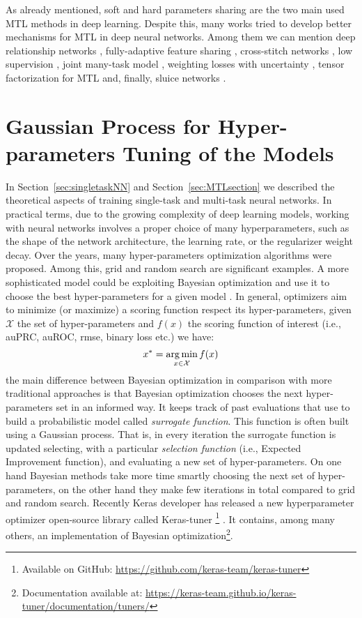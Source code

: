 As already mentioned, soft and hard parameters sharing are the two main used MTL methods in deep learning. Despite this, many works tried to develop better mechanisms for MTL in deep neural networks. Among them we can mention deep relationship networks \cite{NIPS2017_6757}, fully-adaptive feature sharing \cite{fullyadaptive}, cross-stitch networks \cite{crossstichnet}, low supervision \cite{sogaard-goldberg-2016-deep}, joint many-task model \cite{hashimoto-etal-2017-joint}, weighting losses with uncertainty \cite{Kendall}, tensor factorization for MTL \cite{Yang2017DeepMR} and, finally, sluice networks \cite{Ruder2017SluiceNL}.

\section{Gaussian Process for Hyper-parameters Tuning of the Models}
\label{sec:gaussianprocess}
In Section~\ref{sec:singletaskNN} and Section~\ref{sec:MTLsection} we
described the theoretical aspects of training single-task and multi-task neural networks. In practical terms, due to the
growing complexity of deep learning models, working with neural networks
involves a proper choice of many hyperparameters, such as the shape of
the network architecture, the learning rate, or the regularizer weight
decay. Over the years, many hyper-parameters optimization algorithms were
proposed. Among this, grid and random search \cite{BergstraB12} are significant examples. A more sophisticated model could be exploiting Bayesian optimization
and use it to choose the best hyper-parameters for a given model
\cite{SnoekGP}. In general, optimizers aim to minimize (or
maximize) a scoring function respect its hyper-parameters, given
$\mathcal{X}$ the set of hyper-parameters and $f(x)$ the scoring function of interest
(i.e., auPRC, auROC, rmse, binary loss etc.) we have: 
\[ 
x^* =  \operatorname*{arg\,min}_{x \in \mathcal{X}} f(x) 
\]
the main difference between Bayesian optimization in comparison with more
traditional approaches is that Bayesian optimization chooses the next
hyper-parameters set in an informed way. It keeps track of past evaluations
that use to build a probabilistic model called \emph{surrogate function}. This function is often built using a Gaussian process. That is, in every
iteration the surrogate function is updated selecting, with a particular
\emph{selection function} (i.e., Expected Improvement function), and
evaluating a new set of hyper-parameters. On one hand Bayesian methods
take more time smartly choosing the next set of hyper-parameters, on the other hand they make few iterations in total compared to grid and random search. 
Recently Keras developer has released a new hyperparameter optimizer
open-source library called Keras-tuner \footnote{Available on GitHub:
\url{https://github.com/keras-team/keras-tuner}}
\cite{omalley2019kerastuner}. It contains, among many others, an
implementation of Bayesian optimization\footnote{Documentation available
at: \url{https://keras-team.github.io/keras-tuner/documentation/tuners/}}.

